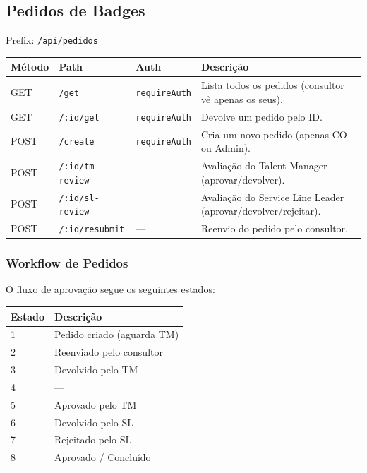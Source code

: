 \documentclass[12pt,a4paper]{article}
\begin{document}
\subsection{Pedidos de Badges}
\label{sec:pedidos}

Prefix: \texttt{/api/pedidos}

\begin{longtable}{@{}lllp{6cm}@{}}
    \toprule
    \textbf{Método} & \textbf{Path} & \textbf{Auth} & \textbf{Descrição} \\
    \midrule
    \endhead
    \bottomrule
    \endfoot

    GET  & \texttt{/get} & \texttt{requireAuth} & Lista todos os pedidos (consultor vê apenas os seus). \\
    GET  & \texttt{/:id/get} & \texttt{requireAuth} & Devolve um pedido pelo ID. \\
    POST & \texttt{/create} & \texttt{requireAuth} & Cria um novo pedido (apenas CO ou Admin). \\
    POST & \texttt{/:id/tm-review} & --- & Avaliação do Talent Manager (aprovar/devolver). \\
    POST & \texttt{/:id/sl-review} & --- & Avaliação do Service Line Leader (aprovar/devolver/rejeitar). \\
    POST & \texttt{/:id/resubmit} & --- & Reenvio do pedido pelo consultor. \\
\end{longtable}

\subsubsection*{Workflow de Pedidos}
O fluxo de aprovação segue os seguintes estados:

\begin{tabular}{ll}
    \toprule
    \textbf{Estado} & \textbf{Descrição} \\
    \midrule
    1 & Pedido criado (aguarda TM) \\
    2 & Reenviado pelo consultor \\
    3 & Devolvido pelo TM \\
    4 & --- \\
    5 & Aprovado pelo TM \\
    6 & Devolvido pelo SL \\
    7 & Rejeitado pelo SL \\
    8 & Aprovado / Concluído \\
    \bottomrule
\end{tabular}
\end{document}
